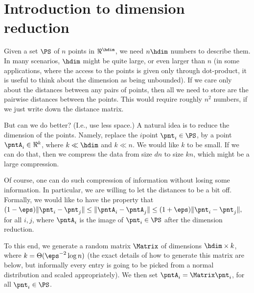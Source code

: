 

\makeatletter
{}
\makeatother
\ifx\bookMode\undefined%
\fi
{}




\ChapterPrefix{}
\ChapterGen{}


\section{Introduction to dimension reduction}

Given a set $\PS$ of $n$ points in $\Re^\hdim$, we need $n\hdim$
numbers to describe them. In many scenarios, $\hdim$ might be quite
large, or even larger than $n$ (in some applications, where the access
to the points is given only through dot-product, it is useful to think
about the dimension as being unbounded). If we care only about the
distances between any pairs of points, then all we need to store are
the pairwise distances between the points. This would require roughly
$n^2$ numbers, if we just write down the distance matrix.

But can we do better? (I.e., use less space.) A natural idea is to
reduce the dimension of the points. Namely, replace the $i$\th point
$\pnt_i \in \PS$, by a point $\pntA_i \in \Re^k$, where $k \ll \hdim$
and $k \ll n$. We would like $k$ to be small. If we can do that, then
we compress the data from size $dn$ to size $kn$, which might be a
large compression.

Of course, one can do such compression of information without losing
some information. In particular, we are willing to let the distances
to be a bit off. Formally, we would like to have the property that
\begin{math}
    (1-\eps)\|{\pnt_i - \pnt_j}\|%
    \leq%
    \|{\pntA_i - \pntA_j}\|%
    \leq%
    (1+\eps)\|{\pnt_i - \pnt_j}\|,
\end{math}
for all $i,j$, where $\pntA_i$ is the image of $\pnt_i \in \PS$ after
the dimension reduction.

To this end, we generate a random matrix $\Matrix$ of dimensions
$\hdim \times k$, where $k = \Theta(\eps^{-2} \log n)$ (the exact
details of how to generate this matrix are below, but informally every
entry is going to be picked from a normal distribution and scaled
appropriately).  We then set $\pntA_i = \Matrix \pnt_i$, for all
$\pnt_i \in \PS$.

